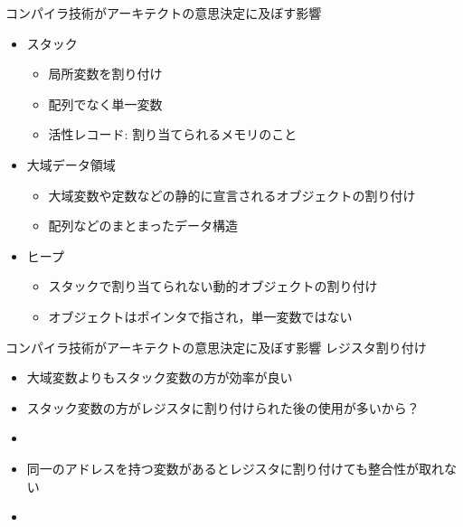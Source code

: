 \documentclass[dvipdfmx]{beamer}
\begin{document}
	\begin{frame}{コンパイラ技術がアーキテクトの意思決定に及ぼす影響}
		\begin{itemize}
			\item スタック
				\begin{itemize}
					\item 局所変数を割り付け
					\item 配列でなく単一変数
					\item 活性レコード: 割り当てられるメモリのこと
				\end{itemize}
			\item 大域データ領域
				\begin{itemize}
					\item 大域変数や定数などの静的に宣言されるオブジェクトの割り付け
					\item 配列などのまとまったデータ構造
				\end{itemize}
			\item ヒープ
				\begin{itemize}
					\item スタックで割り当てられない動的オブジェクトの割り付け
					\item オブジェクトはポインタで指され，単一変数ではない
				\end{itemize}
		\end{itemize}
	\end{frame}

	\begin{frame}{コンパイラ技術がアーキテクトの意思決定に及ぼす影響}
		レジスタ割り付け
		\begin{itemize}
			\item 大域変数よりもスタック変数の方が効率が良い
			\item スタック変数の方がレジスタに割り付けられた後の使用が多いから？
			\item {}\\
			\item 同一のアドレスを持つ変数があるとレジスタに割り付けても整合性が取れない
			\item {}
		\end{itemize}
	\end{frame}
\end{document}
